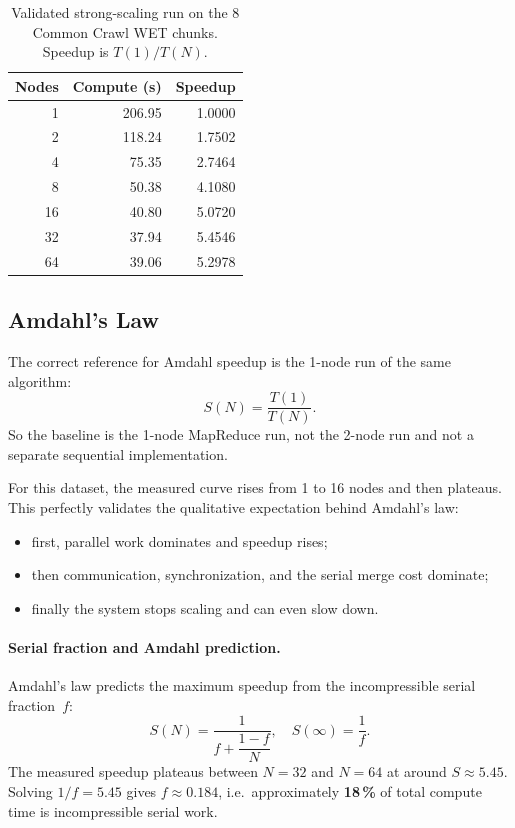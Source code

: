 \documentclass[11pt,a4paper]{article}
\begin{document}
\begin{table}[H]
\centering
\small
\begin{tabular}{r r r}
\toprule
\textbf{Nodes} & \textbf{Compute (s)} & \textbf{Speedup} \\
\midrule
1   & 206.95 & 1.0000 \\
2   & 118.24 & 1.7502 \\
4   & 75.35  & 2.7464 \\
8   & 50.38  & 4.1080 \\
16  & 40.80  & 5.0720 \\
32  & 37.94  & 5.4546 \\
64  & 39.06  & 5.2978 \\
\bottomrule
\end{tabular}
\caption{Validated strong-scaling run on the 8 Common Crawl WET chunks. Speedup is \(T(1)/T(N)\).}
\end{table}

\subsection{Amdahl's Law}

The correct reference for Amdahl speedup is the 1-node run of the same
algorithm:
\[
S(N) = \frac{T(1)}{T(N)}.
\]
So the baseline is the 1-node MapReduce run, not the 2-node run and not a
separate sequential implementation.

For this dataset, the measured curve rises from 1 to 16 nodes and then plateaus. This perfectly validates the qualitative expectation behind
Amdahl's law:
\begin{itemize}[leftmargin=1.5em]
  \item first, parallel work dominates and speedup rises;
  \item then communication, synchronization, and the serial merge cost dominate;
  \item finally the system stops scaling and can even slow down.
\end{itemize}

\paragraph{Serial fraction and Amdahl prediction.}
Amdahl's law predicts the maximum speedup from the incompressible serial
fraction~$f$:
\[
S(N) = \frac{1}{f + \dfrac{1-f}{N}}, \quad S(\infty) = \frac{1}{f}.
\]
The measured speedup plateaus between $N=32$ and $N=64$ at around $S \approx
5.45$. Solving $1/f = 5.45$ gives $f \approx 0.184$, i.e.\ approximately
\textbf{18\,\%} of total compute time is incompressible serial work.
\end{document}
